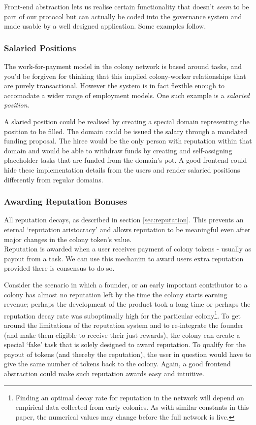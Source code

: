 Front-end abstraction lets us realise certain functionality that doesn't \emph{seem} to be part of our protocol but can actually be coded into the governance system and made usable by a well designed application. Some examples follow.
%

\subsubsection{Salaried Positions}\label{sec:salary}

The work-for-payment model in the colony network is based around tasks, and you'd be forgiven for thinking that this implied colony-worker relationships that are purely transactional. However the system is in fact flexible enough to accomodate a wider range of employment models. One such example is a \emph{salaried position}.

A slaried position could be realised by creating a special domain representing the position to be filled. The domain could be issued the salary through a mandated funding proposal. The hiree would be the only person with reputation within that domain and would be able to withdraw funds by creating and self-assigning placeholder tasks that are funded from the domain's pot. A good frontend could hide these implementation details from the users and render salaried positions differently from regular domains.

\subsubsection{Awarding Reputation Bonuses}

All reputation decays, as described in section \ref{sec:reputation}. This prevents an eternal `reputation aristocracy' and allows reputation to be meaningful even after major changes in the colony token's value. \\
Reputation is awarded when a user receives payment of colony tokens - usually as payout from a task. We can use this mechanim to award users extra reputation provided there is consensus to do so. 

Consider the scenario in which a founder, or an early important contributor to a colony has almost no reputation left by the time the colony starts earning revenue; perhaps the development of the product took a long time or perhaps the reputation decay rate was suboptimally high for the particular colony\footnote{Finding an optimal decay rate for reputation in the network will depend on empirical data collected from early colonies. As with similar constants in this paper, the numerical values may change before the full network is live.}. To get around the limitations of the reputation system and to re-integrate the founder (and make them eligible to receive their just rewards), the colony can create a special `fake' task that is solely designed to award reputation. To qualify for the payout of tokens (and thereby the reputation), the user in question would have to give the same number of tokens back to the colony. Again, a good frontend abstraction could make such reputation awards easy and intuitive.

